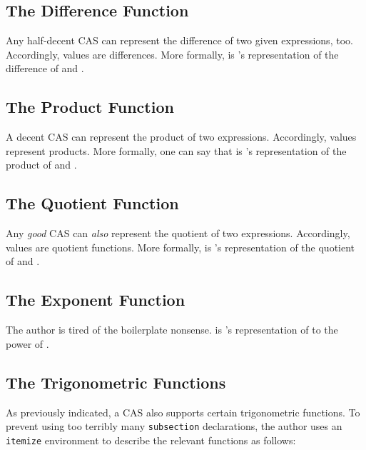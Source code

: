\documentclass{report}
\begin{document}
\subsection{The Difference Function}
Any half-decent CAS can represent the difference of two given expressions, too.  Accordingly, \AgdaField{\AgdaUnderscore{}-\AgdaUnderscore{}} values are differences.  More formally,     is 's representation of the difference of  and .

\subsection{The Product Function}
A decent CAS can represent the product of two expressions.  Accordingly, \AgdaField{\AgdaUnderscore{}*\AgdaUnderscore{}} values represent products.  More formally, one can say that     is 's representation of the product of  and .

\subsection{The Quotient Function}
Any \emph{good} CAS can \emph{also} represent the quotient of two expressions.  Accordingly, \AgdaField{\AgdaUnderscore{}/\AgdaUnderscore{}} values are quotient functions.  More formally,     is 's representation of the quotient of  and .

\subsection{The Exponent Function}
The author is tired of the boilerplate nonsense.      is 's representation of  to the power of .

\subsection{The Trigonometric Functions}
As previously indicated, a CAS also supports certain trigonometric functions.  To prevent using too terribly many \texttt{subsection} declarations, the author uses an \texttt{itemize} environment to describe the relevant functions as follows:
\end{document}
